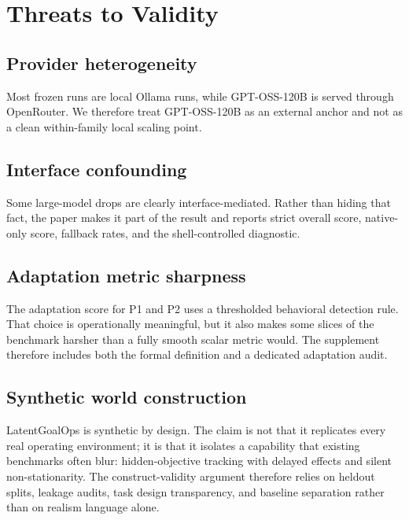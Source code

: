 \section{Threats to Validity}

\subsection{Provider heterogeneity}

Most frozen runs are local Ollama runs, while GPT-OSS-120B is served through
OpenRouter. We therefore treat GPT-OSS-120B as an external anchor and not as a
clean within-family local scaling point.

\subsection{Interface confounding}

Some large-model drops are clearly interface-mediated. Rather than hiding that
fact, the paper makes it part of the result and reports strict overall score,
native-only score, fallback rates, and the shell-controlled diagnostic.

\subsection{Adaptation metric sharpness}

The adaptation score for P1 and P2 uses a thresholded behavioral detection
rule. That choice is operationally meaningful, but it also makes some slices of
the benchmark harsher than a fully smooth scalar metric would. The supplement
therefore includes both the formal definition and a dedicated adaptation audit.

\subsection{Synthetic world construction}

LatentGoalOps is synthetic by design. The claim is not that it replicates every
real operating environment; it is that it isolates a capability that existing
benchmarks often blur: hidden-objective tracking with delayed effects and
silent non-stationarity. The construct-validity argument therefore relies on
heldout splits, leakage audits, task design transparency, and baseline
separation rather than on realism language alone.

